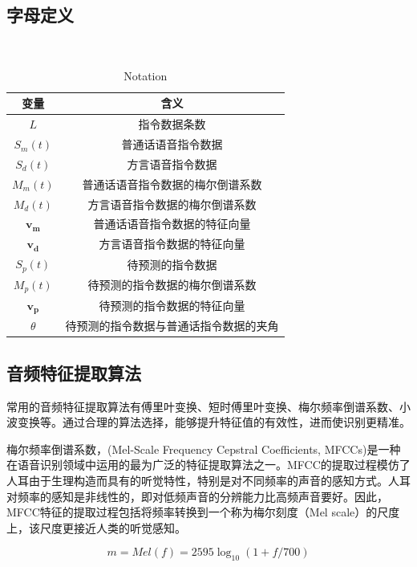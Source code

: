 \documentclass[lang=cn,cite=super]{elegantpaper}
\begin{document}
\subsection{字母定义}
\begin{table}[h]
    \caption{\label{tab:2} Notation}\
    \begin{center}
        \begin{tabular}{cc}
            \hline
            \textbf{变量} & \textbf{含义}\\
            \hline \hline
            $L$ & 指令数据条数\\
            $S_m(t)$ & 普通话语音指令数据\\
            $S_d(t)$ & 方言语音指令数据\\
            $M_m(t)$ & 普通话语音指令数据的梅尔倒谱系数\\
            $M_d(t)$ & 方言语音指令数据的梅尔倒谱系数\\
            $\bm{v_m}$ & 普通话语音指令数据的特征向量\\
            $\bm{v_d}$ & 方言语音指令数据的特征向量\\
            $S_p(t)$ & 待预测的指令数据\\
            $M_p(t)$ & 待预测的指令数据的梅尔倒谱系数\\
            $\bm{v_p}$ & 待预测的指令数据的特征向量\\
            $\theta$ & 待预测的指令数据与普通话指令数据的夹角\\
            \hline
        \end{tabular}
    \end{center}
\end{table}
\subsection{音频特征提取算法}
常用的音频特征提取算法有傅里叶变换、短时傅里叶变换、梅尔频率倒谱系数、小波变换等。通过合理的算法选择，能够提升特征值的有效性，进而使识别更精准。

梅尔频率倒谱系数，(Mel-Scale Frequency Cepstral Coefficients, MFCCs)是一种在语音识别领域中运用的最为广泛的特征提取算法之一。MFCC的提取过程模仿了人耳由于生理构造而具有的听觉特性，特别是对不同频率的声音的感知方式。人耳对频率的感知是非线性的，即对低频声音的分辨能力比高频声音要好。因此，MFCC特征的提取过程包括将频率转换到一个称为梅尔刻度（Mel scale）的尺度上，该尺度更接近人类的听觉感知。

\begin{equation}
    m = Mel(f) = 2595 \log_{10}(1+f/700)
\end{equation}
\end{document}
